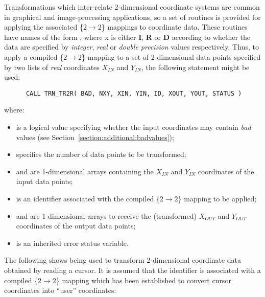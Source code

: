 \label{section:simple:2ddata}

Transformations which inter-relate 2-dimensional coordinate systems are
common in graphical and image-processing applications, so a set of routines
is provided for applying the associated \mbox{\{$2 \rightarrow 2$\}}
mappings to coordinate data. 
These routines have names of the form , where x is either
{\bf I}, {\bf R} or {\bf D} according to whether the data are specified by
{\em integer}, {\em real} or {\em double precision} values respectively. 
Thus, to apply a compiled \mbox{\{$2 \rightarrow 2$\}} mapping to a set of
2-dimensional data points specified by two lists of {\em real} coordinates
$X_{IN}$ and $Y_{IN}$, the following statement might be used: 

\begin{verbatim}
      CALL TRN_TR2R( BAD, NXY, XIN, YIN, ID, XOUT, YOUT, STATUS )
\end{verbatim}

where:

\begin{itemize}

\item {} is a logical value specifying whether the input 
coordinates may contain {\em bad} values (see 
Section~\ref{section:additional:badvalues});

\item {} specifies the number of data points to be transformed;

\item {} and  are 1-dimensional arrays containing
the $X_{IN}$ and $Y_{IN}$ coordinates of the input data points;

\item {} is an identifier associated with the compiled 
\mbox{\{$2 \rightarrow 2$\}} mapping to be applied;

\item {} and  are 1-dimensional arrays to receive
the (transformed) $X_{OUT}$ and $Y_{OUT}$ coordinates of the output data
points; 

\item {} is an inherited error status variable.

\end{itemize}

The following shows  being used to transform 2-dimensional
coordinate data obtained by reading a cursor. 
It is assumed that the identifier  is associated with a compiled
\mbox{\{$2 \rightarrow 2$\}} mapping which has been established to convert
cursor coordinates into ``user'' coordinates: 

